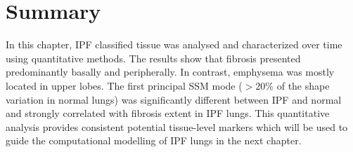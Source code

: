 
\section{Summary}
In this chapter, IPF classified tissue was analysed and characterized over time using quantitative methods. The results show that fibrosis presented predominantly basally and peripherally. In contrast, emphysema was mostly located in upper lobes. The first principal SSM mode ($>20\%$ of the shape variation in normal lungs) was significantly different between IPF and normal and strongly correlated with fibrosis extent in IPF lungs. This quantitative analysis provides consistent potential tissue-level markers which will be used to guide the computational modelling of IPF lungs in the next chapter.